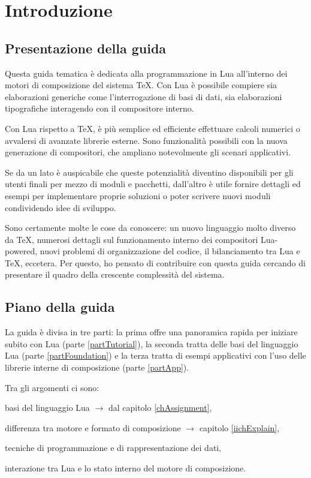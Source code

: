 

\chapter{Introduzione}

\section{Presentazione della guida}

Questa guida tematica è dedicata alla programmazione in Lua all'interno dei
motori di composizione del sistema \TeX. Con Lua è possibile compiere sia
elaborazioni generiche come l'interrogazione di basi di dati, sia elaborazioni
tipografiche interagendo con il compositore interno.

Con Lua rispetto a \TeX, è più semplice ed efficiente effettuare calcoli
numerici o avvalersi di avanzate librerie esterne. Sono funzionalità possibili
con la nuova generazione di compositori, che ampliano notevolmente gli scenari
applicativi.

Se da un lato è auspicabile che queste potenzialità diventino disponibili per
gli utenti finali per mezzo di moduli e pacchetti, dall'altro è utile fornire
dettagli ed esempi per implementare proprie soluzioni o poter scrivere nuovi
moduli condividendo idee di sviluppo.

Sono certamente molte le cose da conoscere: un nuovo linguaggio molto diverso da
\TeX{}, numerosi dettagli sul funzionamento interno dei compositori Lua-powered,
nuovi problemi di organizzazione del codice, il bilanciamento tra Lua e \TeX,
eccetera. Per questo, ho pensato di contribuire con questa guida cercando di
presentare il quadro della crescente complessità del sistema.


\section{Piano della guida}

La guida è divisa in tre parti: la prima offre una panoramica rapida per
iniziare subito con Lua (parte \ref{partTutorial}), la seconda tratta delle basi
del linguaggio Lua (parte \ref{partFoundation}) e la terza tratta di esempi
applicativi con l'uso delle librerie interne di composizione (parte
\ref{partApp}).

Tra gli argomenti ci sono:
\begin{compactitemize}
\item basi del linguaggio Lua \( \to \) dal capitolo \ref{chAssignment},
\item differenza tra motore e formato di composizione \( \to \) capitolo
\ref{iichExplain},
\item tecniche di programmazione e di rappresentazione dei dati,
\item interazione tra Lua e lo stato interno del motore di composizione.
\end{compactitemize}


